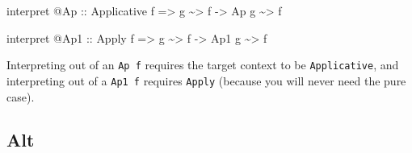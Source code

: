 \documentclass[]{article}
\newenvironment{Shaded}{}{}
\newcommand{\DataTypeTok}[1]{\textcolor[rgb]{0.56,0.13,0.00}{#1}}
\newcommand{\NormalTok}[1]{#1}
\newcommand{\OperatorTok}[1]{\textcolor[rgb]{0.40,0.40,0.40}{#1}}
\newcommand{\OtherTok}[1]{\textcolor[rgb]{0.00,0.44,0.13}{#1}}
\begin{document}
\begin{itemize}
\begin{Shaded}
\begin{Highlighting}[]
\NormalTok{interpret }\OperatorTok{@}\DataTypeTok{Ap}
\OtherTok{    ::} \DataTypeTok{Applicative}\NormalTok{ f}
    \OtherTok{=>}\NormalTok{ g }\OperatorTok{\textasciitilde{}>}\NormalTok{ f}
    \OtherTok{{-}>} \DataTypeTok{Ap}\NormalTok{ g }\OperatorTok{\textasciitilde{}>}\NormalTok{ f}

\NormalTok{interpret }\OperatorTok{@}\DataTypeTok{Ap1}
\OtherTok{    ::} \DataTypeTok{Apply}\NormalTok{ f}
    \OtherTok{=>}\NormalTok{ g }\OperatorTok{\textasciitilde{}>}\NormalTok{ f}
    \OtherTok{{-}>} \DataTypeTok{Ap1}\NormalTok{ g }\OperatorTok{\textasciitilde{}>}\NormalTok{ f}
\end{Highlighting}
\end{Shaded}

  Interpreting out of an \texttt{Ap\ f} requires the target context to be
  \texttt{Applicative}, and interpreting out of a \texttt{Ap1\ f} requires
  \texttt{Apply} (because you will never need the pure case).
\end{itemize}

\hypertarget{alt}{%
\subsection{Alt}\label{alt}}
\end{document}
